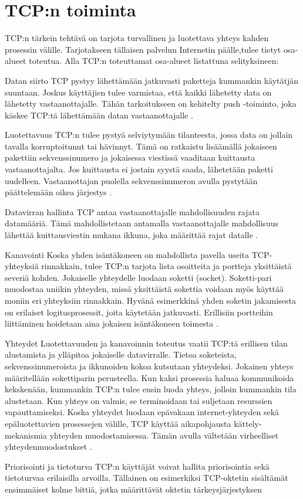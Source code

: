 \documentclass[utf8]{gradu3}
\begin{document}
\section{TCP:n toiminta}
TCP:n tärkein tehtävä on tarjota turvallinen ja luotettava yhteys kahden prosessin välille. Tarjotakseen tällaisen palvelun Internetin päälle,tulee tietyt osa-alueet toteutua. Alla TCP:n toteuttamat osa-alueet listattuna selityksineen:

\begin{desclist}
\item[Datan siirto] TCP pystyy lähettämään jatkuvasti paketteja kummankin käytätjän suuntaan. Joskus käyttäjien tulee varmistaa, että kaikki lähetetty data on lähetetty vastaanottajalle. Tähän tarkoitukseen on kehitelty push -toiminto, joka käskee TCP:tä
lähettämään datan vastaanottajalle \cite{tcp1_4}.
\item[Luotettavuus] TCP:n tulee pystyä selviytymään tilanteesta, jossa data on jollain tavalla korruptoitunut tai hävinnyt. Tämä on ratkaistu lisäämällä jokaiseen pakettiin sekvenssinumero ja jokaisessa viestissä vaaditaan kuittausta vastaanottajalta. Jos kuittausta ei jostain syystä saada, lähetetään paketti uudelleen. Vastaanottajan puolella sekvenssinumeron avulla pystytään päättelemään oikea järjestys \cite{tcp1_4}.
\item[Datavirran hallinta] TCP antaa vastaanottajalle mahdollisuuden rajata datamääriä. Tämä mahdollistetaan antamalla vastaanottajalle mahdollisuus lähettää kuittausviestin mukana ikkuna, joka määrittää rajat datalle \cite{tcp1_4}.
\item[Kanavointi] Koska yhden isäntäkoneen on mahdollista pavella useita TCP-yhteyksiä rinnakkain, tulee TCP:n tarjota lista osoitteita ja portteja yksittäistä severiä kohden. Jokaiselle yhteydelle luodaan soketti (socket). Soketti-pari muodostaa uniikin yhteyden, missä yksittäistä sokettia voidaan myös käyttää moniin eri yhteyksiin rinnakkain. Hyvänä esimerkkinä yhden soketin jakamisesta on erilaiset logitusprosessit, joita käytetään jatkuvasti.  Erillisiin portteihin liittäminen hoidetaan aina jokaisen isäntäkoneen toimesta \cite{tcp1_4}.
\item[Yhteydet] Luotettavuuden ja kanavoinnin toteutus vaatii TCP:tä erillisen tilan alustamista ja ylläpitoa jokaiselle datavirralle. Tietoa soketeista, sekvenssinumeroista ja ikkunoiden kokoa kutsutaan yhteydeksi. Jokainen yhteys määritellään sokettiparin perusteella. Kun kaksi prosessia haluaa kommunikoida kekskenään, kummankin TCP:n tulee ensin luoda yhteys, jolloin kummankin tila alustetaan. Kun yhteys on valmis, se terminoidaan tai suljetaan resurssien vapauttamiseksi. Koska yhteydet luodaan epävakaan internet-yhteyden sekä epäluotettavien prosessejen välille, TCP käyttää aikapohjausta kättely-mekanismia yhteyden muodostamisessa. Tämän avulla vältetään virheelliset yhteydenmuodostukset \cite{tcp1_4}.
\item[Priorisointi ja tietoturva] TCP:n käyttäjät voivat hallita priorisointia sekä tietoturvaa erilaisilla arvoilla. Tällainen on esimerkiksi TCP-oktetin sisältämät ensimmäiset kolme bittiä, jotka määrittävät oktetin tärkeysjärjestyksen \cite{tcp_terminology}
\end{desclist}
\end{document}
